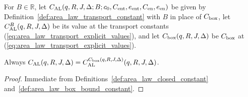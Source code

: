 \begin{definition}
    \label{def:area_law_box_bound_constant}
    \leanok
    For $B\in\mathbb R$, let
    $C_{\rm AL}(q,R,J,\Delta;B;c_0,C_{\rm ent},e_{\rm ent},C_{\rm en},e_{\rm en})$
    be given by Definition~\ref{def:area_law_transport_constant} with $B$ in place of $C_{\rm box}$, let $C_{\rm AL}^B(q,R,J,\Delta)$ be its value at the transport constants (\ref{eq:area_law_transport_explicit_values}), and let $C_{\rm box}(q,R,J,\Delta)$ be $C_{\rm box}$ at (\ref{eq:area_law_transport_explicit_values}).
\end{definition}

\begin{lemma}
    \label{thm:area_law_box_bound_constant_at_box}
    \leanok
    Always $C_{\rm AL}(q,R,J,\Delta)=C_{\rm AL}^{C_{\rm box}(q,R,J,\Delta)}(q,R,J,\Delta)$.
\end{lemma}
\begin{proof}
    \leanok
    Immediate from Definitions~\ref{def:area_law_closed_constant} and~\ref{def:area_law_box_bound_constant}.
\end{proof}

